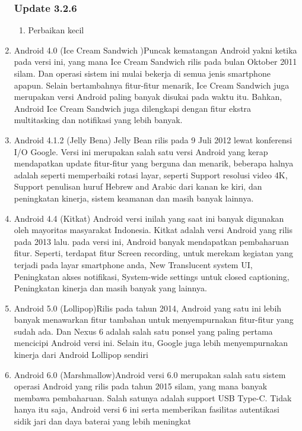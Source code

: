 \begin{enumerate}
\subsubsection{Update 3.2.6}
\begin{enumerate}
\item Perbaikan kecil
\end{enumerate}
\item Android 4.0 (Ice Cream Sandwich )Puncak kematangan Android yakni ketika pada versi ini, yang mana Ice Cream Sandwich rilis pada bulan Oktober 2011 silam. Dan operasi sistem ini mulai bekerja di semua jenis smartphone apapun. Selain bertambahnya fitur-fitur menarik, Ice Cream Sandwich juga merupakan versi Android paling banyak disukai pada waktu itu. Bahkan, Android Ice Cream Sandwich juga dilengkapi dengan fitur ekstra multitasking dan notifikasi yang lebih banyak.
\item Android 4.1.2 (Jelly Bena)
Jelly Bean rilis pada 9 Juli 2012 lewat konferensi I/O Google. Versi ini merupakan salah satu versi Android yang kerap mendapatkan update fitur-fitur yang berguna dan menarik, beberapa halnya adalah seperti memperbaiki rotasi layar, seperti Support resolusi video 4K, Support penulisan huruf Hebrew and Arabic dari kanan ke kiri, dan peningkatan kinerja, sistem keamanan dan masih banyak lainnya.
\item Android 4.4 (Kitkat)
Android versi inilah yang saat ini banyak digunakan oleh mayoritas masyarakat Indonesia. Kitkat adalah versi Android yang rilis pada 2013 lalu. pada versi ini, Android banyak mendapatkan pembaharuan fitur. Seperti, terdapat fitur Screen recording, untuk merekam kegiatan yang terjadi pada layar smartphone anda, New Translucent system UI, Peningkatan akses notifikasi, System-wide settings untuk closed captioning, Peningkatan kinerja dan masih banyak yang lainnya.
\item Android 5.0 (Lollipop)Rilis pada tahun 2014, Android yang satu ini lebih banyak menawarkan fitur tambahan untuk menyempurnakan fitur-fitur yang sudah ada. Dan Nexus 6 adalah salah satu ponsel yang paling pertama mencicipi Android versi ini. Selain itu, Google juga lebih menyempurnakan kinerja dari Android Lollipop sendiri
\item Android 6.0 (Marshmallow)Android versi 6.0 merupakan salah satu sistem operasi Android yang rilis pada tahun 2015 silam, yang mana banyak membawa pembaharuan. Salah satunya adalah support USB Type-C. Tidak hanya itu saja, Android versi 6 ini serta memberikan fasilitas autentikasi sidik jari dan daya baterai yang lebih meningkat

\end{enumerate}
